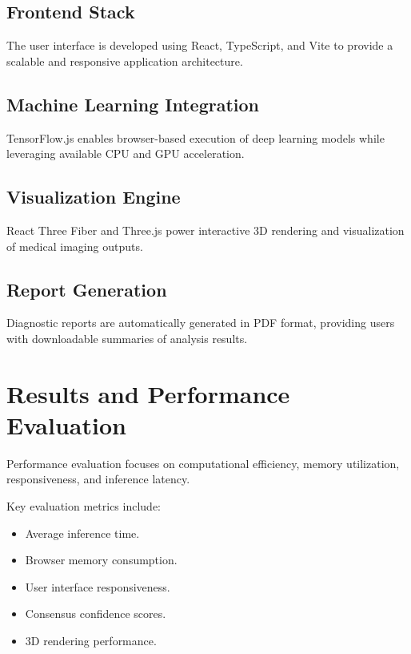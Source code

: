 \documentclass[journal]{IEEEtran}
\begin{document}
\subsection{Frontend Stack}

The user interface is developed using React, TypeScript, and Vite to provide a scalable and responsive application architecture.

\subsection{Machine Learning Integration}

TensorFlow.js enables browser-based execution of deep learning models while leveraging available CPU and GPU acceleration.

\subsection{Visualization Engine}

React Three Fiber and Three.js power interactive 3D rendering and visualization of medical imaging outputs.

\subsection{Report Generation}

Diagnostic reports are automatically generated in PDF format, providing users with downloadable summaries of analysis results.

\section{Results and Performance Evaluation}

Performance evaluation focuses on computational efficiency, memory utilization, responsiveness, and inference latency.

Key evaluation metrics include:

\begin{itemize}
    \item Average inference time.
    \item Browser memory consumption.
    \item User interface responsiveness.
    \item Consensus confidence scores.
    \item 3D rendering performance.
\end{itemize}
\end{document}
